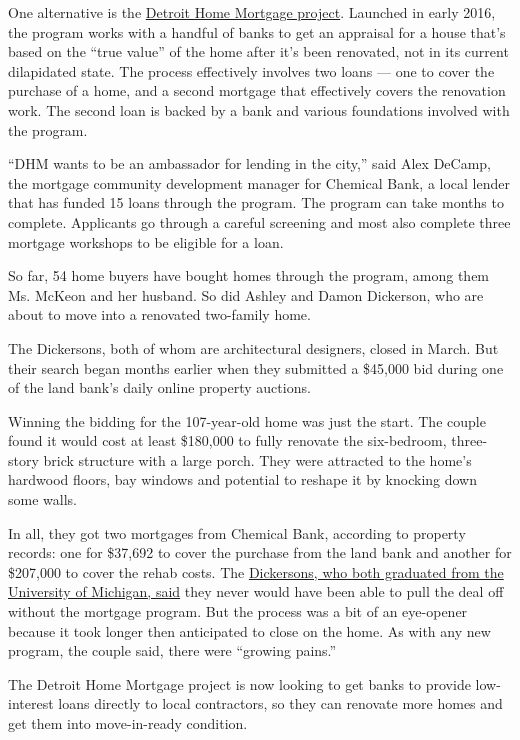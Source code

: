 One alternative is the
\href{http://www.detroithomemortgage.org/}{Detroit Home Mortgage
project}. Launched in early 2016, the program works with a handful of
banks to get an appraisal for a house that's based on the ``true value''
of the home after it's been renovated, not in its current dilapidated
state. The process effectively involves two loans --- one to cover the
purchase of a home, and a second mortgage that effectively covers the
renovation work. The second loan is backed by a bank and various
foundations involved with the program.

``DHM wants to be an ambassador for lending in the city,'' said Alex
DeCamp, the mortgage community development manager for Chemical Bank, a
local lender that has funded 15 loans through the program. The program
can take months to complete. Applicants go through a careful screening
and most also complete three mortgage workshops to be eligible for a
loan.

So far, 54 home buyers have bought homes through the program, among them
Ms. McKeon and her husband. So did Ashley and Damon Dickerson, who are
about to move into a renovated two-family home.

The Dickersons, both of whom are architectural designers, closed in
March. But their search began months earlier when they submitted a
\$45,000 bid during one of the land bank's daily online property
auctions.

Winning the bidding for the 107-year-old home was just the start. The
couple found it would cost at least \$180,000 to fully renovate the
six-bedroom, three-story brick structure with a large porch. They were
attracted to the home's hardwood floors, bay windows and potential to
reshape it by knocking down some walls.

In all, they got two mortgages from Chemical Bank, according to property
records: one for \$37,692 to cover the purchase from the land bank and
another for \$207,000 to cover the rehab costs. The
\href{https://www.youtube.com/watch?v=523u2nWWRsI}{Dickersons, who both
graduated from the University of Michigan, said} they never would have
been able to pull the deal off without the mortgage program. But the
process was a bit of an eye-opener because it took longer then
anticipated to close on the home. As with any new program, the couple
said, there were ``growing pains.''

The Detroit Home Mortgage project is now looking to get banks to provide
low-interest loans directly to local contractors, so they can renovate
more homes and get them into move-in-ready condition.


